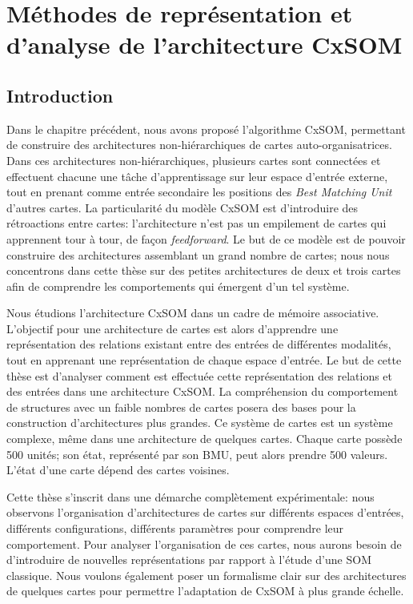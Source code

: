 \chapter{Méthodes de représentation et d'analyse de l'architecture CxSOM}
\graphicspath{{03-Representation/}}
\minitoc

\section{Introduction}

Dans le chapitre précédent, nous avons proposé l'algorithme CxSOM, permettant de construire des architectures non-hiérarchiques de cartes auto-organisatrices. 
Dans ces architectures non-hiérarchiques, plusieurs cartes sont connectées et effectuent chacune une tâche d'apprentissage sur leur espace d'entrée externe, tout en prenant comme entrée secondaire les positions des \emph{Best Matching Unit} d'autres cartes. La particularité du modèle CxSOM est d'introduire des rétroactions entre cartes: l'architecture n'est pas un empilement de cartes qui apprennent tour à tour, de façon \emph{feedforward}.
Le but de ce modèle est de pouvoir construire des architectures assemblant un grand nombre de cartes; nous nous concentrons dans cette thèse sur des petites architectures de deux et trois cartes afin de comprendre les comportements qui émergent d'un tel système.

Nous étudions l'architecture CxSOM dans un cadre de mémoire associative.
L'objectif pour une architecture de cartes est alors d'apprendre une représentation des relations existant entre des entrées de différentes modalités, tout en apprenant une représentation de chaque espace d'entrée.
Le but de cette thèse est d'analyser comment est effectuée cette représentation des relations et des entrées dans une architecture CxSOM.
La compréhension du comportement de structures avec un faible nombres de cartes posera des bases pour la construction d'architectures plus grandes.
Ce système de cartes est un système complexe, même dans une architecture de quelques cartes. Chaque carte possède 500 unités; son état, représenté par son BMU, peut alors prendre 500 valeurs. L'état d'une carte dépend des cartes voisines.

Cette thèse s'inscrit dans une démarche complètement expérimentale: nous observons l'organisation d'architectures de cartes sur différents espaces d'entrées, différents configurations, différents paramètres pour comprendre leur comportement. 
Pour analyser l'organisation de ces cartes, nous aurons besoin de d'introduire de nouvelles représentations par rapport à l'étude d'une SOM classique. Nous voulons également poser un formalisme clair sur des architectures de quelques cartes pour permettre l'adaptation de CxSOM à plus grande échelle.

